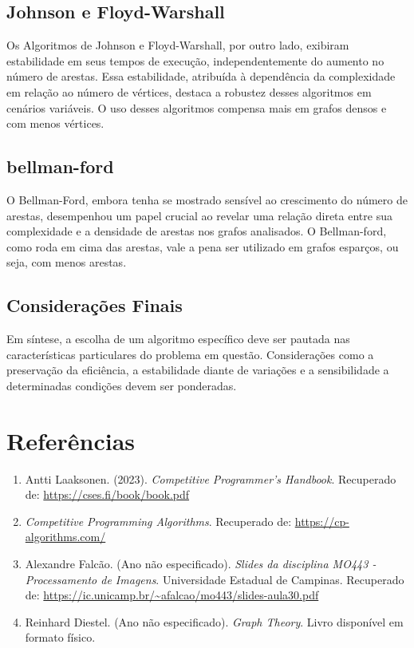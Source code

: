 \documentclass[12pt]{article}
\begin{document}
\subsection{Johnson e Floyd-Warshall}
Os Algoritmos de Johnson e Floyd-Warshall, por outro lado, exibiram estabilidade em seus tempos de execução, independentemente do aumento no número de arestas. Essa estabilidade, atribuída à dependência da complexidade em relação ao número de vértices, destaca a robustez desses algoritmos em cenários variáveis. O uso desses algoritmos compensa mais em grafos densos e com menos vértices.

\subsection{bellman-ford}
O Bellman-Ford, embora tenha se mostrado sensível ao crescimento do número de arestas, desempenhou um papel crucial ao revelar uma relação direta entre sua complexidade e a densidade de arestas nos grafos analisados. O Bellman-ford, como roda em cima das arestas, vale a pena ser utilizado em grafos esparços, ou seja, com menos arestas.

\subsection{Considerações Finais}
Em síntese, a escolha de um algoritmo específico deve ser pautada nas características particulares do problema em questão. Considerações como a preservação da eficiência, a estabilidade diante de variações e a sensibilidade a determinadas condições devem ser ponderadas.

\section{Referências}

\begin{enumerate}
    \item Antti Laaksonen. (2023). \textit{Competitive Programmer's Handbook}. Recuperado de: \url{https://cses.fi/book/book.pdf}
    
    \item \textit{Competitive Programming Algorithms}. Recuperado de: \url{https://cp-algorithms.com/}
    
    \item Alexandre Falcão. (Ano não especificado). \textit{Slides da disciplina MO443 - Processamento de Imagens}. Universidade Estadual de Campinas. Recuperado de: \url{https://ic.unicamp.br/~afalcao/mo443/slides-aula30.pdf}
    
    \item Reinhard Diestel. (Ano não especificado). \textit{Graph Theory}. Livro disponível em formato físico.
\end{enumerate}
\end{document}
